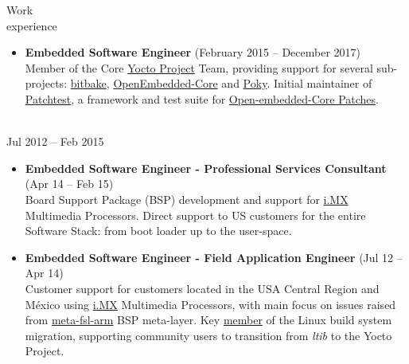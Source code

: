 \documentclass{resume}
\def\fsl{Freescale Semiconductor}
\begin{document}
\begin{category}{Work \\experience}
\begin{itemize}
\item \textbf{Embedded Software Engineer} (February 2015 -- December 2017)\\
  Member of the Core \href{https://www.yoctoproject.org/}{Yocto Project} Team,
  providing support for several sub-projects:
  \href{https://lists.openembedded.org/g/bitbake-devel/search?p=recentpostdate%252Fsticky%2C%2C%2C20%2C2%2C0%2C0&q=Leonardo+Sandoval}{bitbake},
  \href{https://lists.openembedded.org/g/openembedded-core/search?p=recentpostdate%252Fsticky%2C%2C%2C20%2C2%2C0%2C0&q=Leonardo+Sandoval}{OpenEmbedded-Core} and
    \href{https://lists.yoctoproject.org/g/poky/search?p=created%2C0%2C%2C1%2C2%2C0%2C0&q=Leonardo+Sandoval}{Poky}. Initial maintainer of
      \href{http://git.yoctoproject.org/cgit/cgit.cgi/patchtest/}{Patchtest},
    a framework and test suite for \href{https://patchwork.openembedded.org/project/oe-core/series/?ordering=-last_updated}{Open-embedded-Core Patches}.
\end{itemize}

\citem{\fsl}\\
Jul 2012 -- Feb 2015
\begin{itemize}
\item \textbf{Embedded Software Engineer - Professional Services Consultant} (Apr 14 -- Feb 15)\\
  Board Support Package (BSP) development and support for \href{https://www.nxp.com/products/processors-and-microcontrollers/arm-processors/i-mx-applications-processors:IMX_HOME}{i.MX}
  Multimedia Processors. Direct support to US customers for the entire Software Stack: from boot loader up to the user-space.
\end{itemize}

\begin{itemize}
\item \textbf{Embedded Software Engineer - Field Application Engineer} (Jul 12 -- Apr 14)\\
  Customer support for customers located in the USA Central Region and M\'exico using
  \href{https://www.nxp.com/products/processors-and-microcontrollers/arm-processors/i-mx-applications-processors:IMX_HOME}{i.MX}
  Multimedia Processors, with main focus on issues raised from \href{https://git.yoctoproject.org/cgit/cgit.cgi/meta-fsl-arm}{meta-fsl-arm} BSP meta-layer.
  Key \href{https://community.nxp.com/t5/user/viewprofilepage/user-id/25586}{member}
  of the Linux build system migration, supporting community users to transition from \textit{ltib} to the Yocto Project.
\end{itemize}


\end{category}
\end{document}
